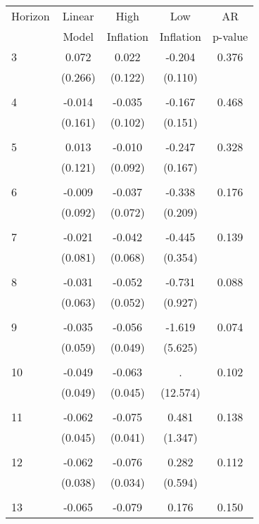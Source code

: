 \begin{tabular}{l*{1}{cccc}}
\hline\hline
 Horizon  & Linear & High                 & Low           & AR            \\
                  & Model         & Inflation & Inflation & p-value       \\
\hline
   3       & 0.072 & 0.022 & -0.204 & 0.376 \\
          & (0.266) & (0.122) & (0.110) & \\
 & & & &\\
   4       & -0.014 & -0.035 & -0.167 & 0.468 \\
          & (0.161) & (0.102) & (0.151) & \\
 & & & &\\
   5       & 0.013 & -0.010 & -0.247 & 0.328 \\
          & (0.121) & (0.092) & (0.167) & \\
 & & & &\\
   6       & -0.009 & -0.037 & -0.338 & 0.176 \\
          & (0.092) & (0.072) & (0.209) & \\
 & & & &\\
   7       & -0.021 & -0.042 & -0.445 & 0.139 \\
          & (0.081) & (0.068) & (0.354) & \\
 & & & &\\
   8       & -0.031 & -0.052 & -0.731 & 0.088 \\
          & (0.063) & (0.052) & (0.927) & \\
 & & & &\\
   9       & -0.035 & -0.056 & -1.619 & 0.074 \\
          & (0.059) & (0.049) & (5.625) & \\
 & & & &\\
  10       & -0.049 & -0.063 &     . & 0.102 \\
          & (0.049) & (0.045) & (12.574) & \\
 & & & &\\
  11       & -0.062 & -0.075 & 0.481 & 0.138 \\
          & (0.045) & (0.041) & (1.347) & \\
 & & & &\\
  12       & -0.062 & -0.076 & 0.282 & 0.112 \\
          & (0.038) & (0.034) & (0.594) & \\
 & & & &\\
  13       & -0.065 & -0.079 & 0.176 & 0.150 \\

\end{tabular}
